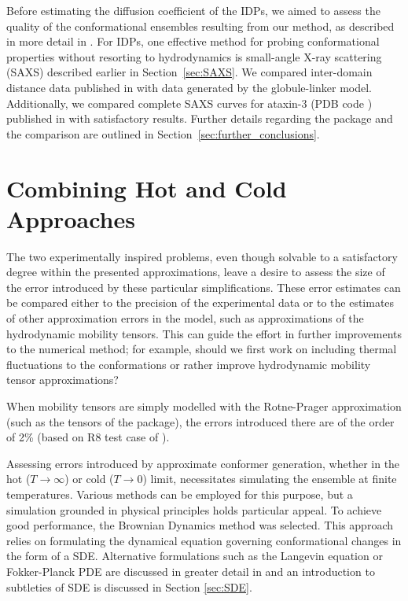 \documentclass{doctoral}
\newcommand{\code}[1]{\texttt{\detokenize{#1}}}
\begin{document}
Before estimating the diffusion coefficient of the IDPs, we aimed to assess the quality of the conformational ensembles resulting from our method, as described in more detail in \textcite{Waszkiewicz_2024_mda}.
For IDPs, one effective method for probing conformational properties without resorting to hydrodynamics is small-angle X-ray scattering (SAXS) described earlier in Section~\ref{sec:SAXS}.
We compared inter-domain distance data published in \textcite{Rozycki_2022} with data generated by the globule-linker model.
Additionally, we compared complete SAXS curves for ataxin-3 (PDB code \code{1yzb}) published in \cite{Lin_2017} with satisfactory results.
Further details regarding the \code{saxs_single_bead} package and the comparison are outlined in Section~\ref{sec:further_conclusions}.

\section{Combining Hot and Cold Approaches}
\label{sec:combining_hot_and_cold_approaches}
The two experimentally inspired problems, even though solvable to a satisfactory degree within the presented approximations, leave a desire to assess the size of the error introduced by these particular simplifications.
These error estimates can be compared either to the precision of the experimental data or to the estimates of other approximation errors in the model, such as approximations of the hydrodynamic mobility tensors.
This can guide the effort in further improvements to the numerical method; for example, should we first work on including thermal fluctuations to the conformations or rather improve hydrodynamic mobility tensor approximations?

When mobility tensors are simply modelled with the Rotne-Prager approximation (such as the tensors of the \code{pygrpy} package), the errors introduced there are of the order of 2\% (based on R8 test case of \cite{Zuk_2018}).

Assessing errors introduced by approximate conformer generation, whether in the hot ($T\to\infty$) or cold ($T\to0$) limit, necessitates simulating the ensemble at finite temperatures.
Various methods can be employed for this purpose, but a simulation grounded in physical principles holds particular appeal.
To achieve good performance, the Brownian Dynamics method was selected.
This approach relies on formulating the dynamical equation governing conformational changes in the form of a SDE.
Alternative formulations such as the Langevin equation or Fokker-Planck PDE are discussed in greater detail in \textcite{Waszkiewicz_2023_pychastic} and an introduction to subtleties of SDE is discussed in Section \ref{sec:SDE}.
\end{document}
